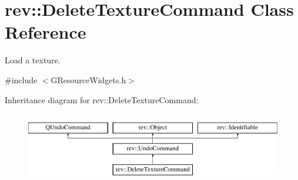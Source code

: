 \hypertarget{classrev_1_1_delete_texture_command}{}\section{rev\+::Delete\+Texture\+Command Class Reference}
\label{classrev_1_1_delete_texture_command}


Load a texture.  




{\ttfamily \#include $<$G\+Resource\+Widgets.\+h$>$}

Inheritance diagram for rev\+::Delete\+Texture\+Command\+:\begin{figure}[H]
\begin{center}
\leavevmode
\includegraphics[height=3.000000cm]{classrev_1_1_delete_texture_command}
\end{center}
\end{figure}
